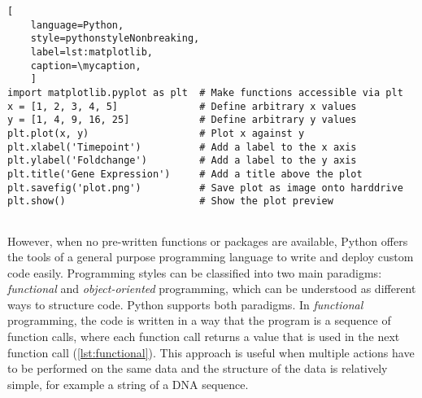 \def\mycaption{ Example of using pre-written functions of a Python package. The
    functions of the package \texttt{matplotlib.pyplot} become accessable by
    importing the package as \texttt{plt}, where plt serves as an alias (or rather
    shortcut) to access the functions of the package. Then, two arbitrary lists are
    defined, \texttt{x} and \texttt{y}. These datapoints are plotted (scatterplot)
    using the function \texttt{plot} The plots x- and y-axes are then labeled and
    saved as an image. The code is written in a sequence of function calls, where
    the state of the plot is saved in the background. The plot is then displayed
    using the function \texttt{show}. }
\begin{lstlisting}[
    language=Python,
    style=pythonstyleNonbreaking,
    label=lst:matplotlib,
    caption=\mycaption,
    ]
import matplotlib.pyplot as plt  # Make functions accessible via plt
x = [1, 2, 3, 4, 5]              # Define arbitrary x values
y = [1, 4, 9, 16, 25]            # Define arbitrary y values
plt.plot(x, y)                   # Plot x against y
plt.xlabel('Timepoint')          # Add a label to the x axis
plt.ylabel('Foldchange')         # Add a label to the y axis
plt.title('Gene Expression')     # Add a title above the plot
plt.savefig('plot.png')          # Save plot as image onto harddrive
plt.show()                       # Show the plot preview
    
\end{lstlisting}

However, when no pre-written functions or packages are available, Python offers
the tools of a general purpose programming language to write and deploy custom
code easily. Programming styles can be classified into two main paradigms:
\emph{functional} and \emph{object-oriented} programming, which can be
understood as different ways to structure code. Python supports both paradigms.
In \emph{functional} programming, the code is written in a way that the program
is a sequence of function calls, where each function call returns a value that
is used in the next function call (\autoref{lst:functional}). This approach is
useful when multiple actions have to be performed on the same data and the
structure of the data is relatively simple, for example a string of a DNA
sequence.

